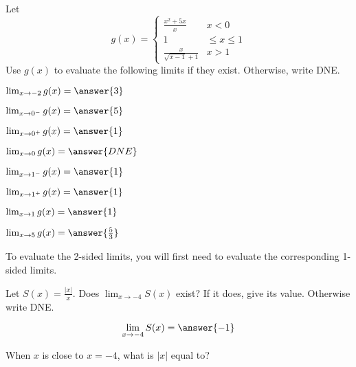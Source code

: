 \documentclass[handout]{ximera}
\begin{document}
\begin{exercise}
Let
\[
g(x) = \begin{cases}
  \frac{x^2+5x}{x}  & x<0 \\
  1 & \leq x \leq 1 \\
  \frac{x}{\sqrt{x-1} +1} & x>1
\end{cases}
\]
Use $g(x)$ to evaluate the following limits if they exist.  Otherwise, write DNE.

\begin{itemize}

\begin{multicols}{2}

\item [] $\lim_{x \to -2} g(x) = \answer{3}$

\item [] $\lim_{x \to 0^-} g(x) = \answer{5}$

\item [] $\lim_{x \to 0^+} g(x) = \answer{1}$

\item [] $\lim_{x \to 0} g(x) = \answer{DNE}$

\item [] $\lim_{x \to 1^-} g(x) = \answer{1}$

\item [] $\lim_{x \to 1^+} g(x) = \answer{1}$

\item [] $\lim_{x \to 1} g(x) = \answer{1}$

\item [] $\lim_{x \to 5} g(x) = \answer{\frac{5}{3}}$

\end{multicols}

\end{itemize}

\begin{hint}

To evaluate the 2-sided limits, you will first need to evaluate the corresponding 1-sided limits. 

\end{hint}

\end{exercise}

\begin{exercise}
Let $S(x) = \frac{|x|}{x}$.  Does $\displaystyle\lim_{x \to -4} S(x)$ exist?  If it
does, give its value.  Otherwise write DNE.

\[
\lim_{x \to -4} S(x) = \answer{-1}
\] 

\begin{hint}
When $x$ is close to $x=-4$, what is $|x|$ equal to? 
\end{hint}

\end{exercise}
\end{document}
